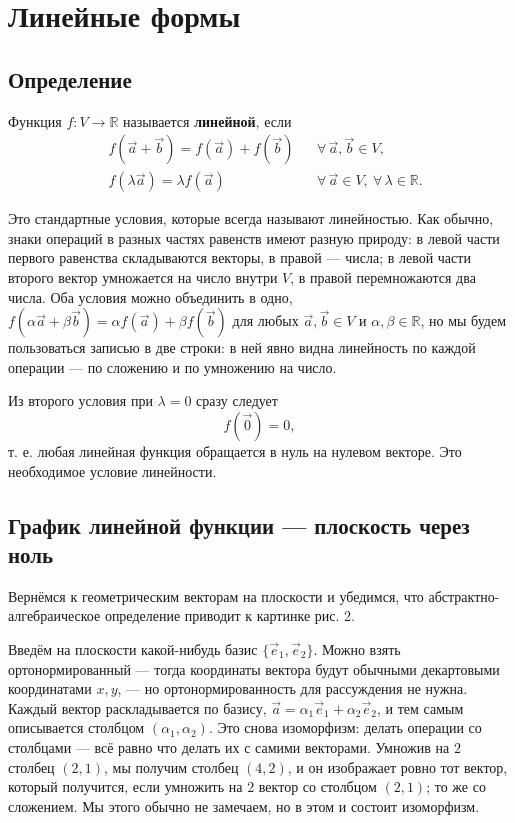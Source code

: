 \documentclass[11pt,a4paper]{article}
\begin{document}
\section{Линейные формы}

\subsection{Определение}

Функция $f\colon V \to \mathbb{R}$ называется \textbf{линейной}, если
\[
\begin{aligned}
&f(\vec a + \vec b) = f(\vec a) + f(\vec b) &&\forall\, \vec a, \vec b \in V, \\
&f(\lambda \vec a) = \lambda f(\vec a) &&\forall\, \vec a \in V,\ \forall\, \lambda \in \mathbb{R}.
\end{aligned}
\]

Это стандартные условия, которые всегда называют линейностью. Как обычно, знаки операций в разных частях равенств имеют разную природу: в левой части первого равенства складываются векторы, в правой — числа; в левой части второго вектор умножается на число внутри $V$, в правой перемножаются два числа. Оба условия можно объединить в одно, $f(\alpha \vec a + \beta \vec b) = \alpha f(\vec a) + \beta f(\vec b)$ для любых $\vec a, \vec b \in V$ и $\alpha, \beta \in \mathbb{R}$, но мы будем пользоваться записью в две строки: в ней явно видна линейность по каждой операции — по сложению и по умножению на число.

Из второго условия при $\lambda = 0$ сразу следует
\[
f(\vec 0) = 0,
\]
т. е. любая линейная функция обращается в нуль на нулевом векторе. Это необходимое условие линейности.

\subsection{График линейной функции — плоскость через ноль}

Вернёмся к геометрическим векторам на плоскости и убедимся, что абстрактно-алгебраическое определение приводит к картинке рис. 2.

Введём на плоскости какой-нибудь базис $\{\vec e_1, \vec e_2\}$. Можно взять ортонормированный — тогда координаты вектора будут обычными декартовыми координатами $x, y$, — но ортонормированность для рассуждения не нужна. Каждый вектор раскладывается по базису, $\vec a = \alpha_1 \vec e_1 + \alpha_2 \vec e_2$, и тем самым описывается столбцом $(\alpha_1, \alpha_2)$. Это снова изоморфизм: делать операции со столбцами — всё равно что делать их с самими векторами. Умножив на $2$ столбец $(2, 1)$, мы получим столбец $(4, 2)$, и он изображает ровно тот вектор, который получится, если умножить на $2$ вектор со столбцом $(2, 1)$; то же со сложением. Мы этого обычно не замечаем, но в этом и состоит изоморфизм.
\end{document}
